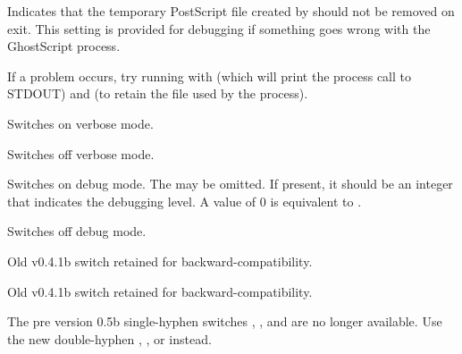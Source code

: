 \documentclass[toc=listof]{scrreport}
\begin{document}

Indicates that the temporary PostScript file created by 
should not be removed on exit. This setting is provided for
debugging if something goes wrong with the GhostScript process.

\begin{information}
If a problem occurs, try running  with
 (which will print the process call to STDOUT) 
and  (to retain the file used by the process).
\end{information}


Switches on verbose mode.


Switches off verbose mode.


Switches on debug mode.
The  may be omitted. If present, it should be an integer
that indicates the debugging level. A value of 0 is equivalent to
.


Switches off debug mode.


Old v0.4.1b switch retained for backward-compatibility.


Old v0.4.1b switch retained for backward-compatibility.

\begin{information}
The pre version 0.5b single-hyphen switches
,
,
 and
 are no longer available.
Use the new double-hyphen 
,
,
 or
 instead.
\end{information}

\printmain

\printindex
\end{document}
